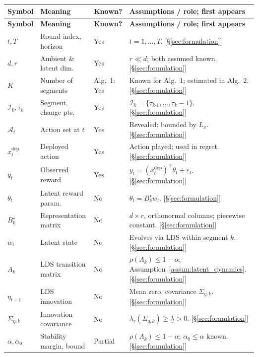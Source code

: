 \documentclass{article}
\newcommand{\cA}{\mathcal{A}}
\newcommand{\cI}{\mathcal{I}}
\begin{document}
\begin{longtable}{@{}p{} p{} p{} p{}@{}}
\toprule
\textbf{Symbol} & \textbf{Meaning} & \textbf{Known?} & \textbf{Assumptions / role; first appears} \\
\midrule
\endfirsthead
\toprule
\textbf{Symbol} & \textbf{Meaning} & \textbf{Known?} & \textbf{Assumptions / role; first appears} \\
\midrule
\endhead
\bottomrule
\endfoot
$t, T$ & Round index, horizon & Yes & $t=1,\dots,T$. [\S\ref{sec:formulation}] \\
$d, r$ & Ambient \& latent dim. & Yes & $r\ll d$; both assumed known. [\S\ref{sec:formulation}] \\
$K$ & Number of segments & Alg.~1: Yes & Known for Alg.~1; estimated in Alg.~2. [\S\ref{sec:formulation}] \\
$\cI_k, \tau_k$ & Segment, change pts. & Yes & $\cI_k = \{\tau_{k\text{-}1},\dots,\tau_k{-}1\}$. [\S\ref{sec:formulation}] \\
$\cA_t$ & Action set at $t$ & Yes & Revealed; bounded by $L_x$. [\S\ref{sec:formulation}] \\
$x_t^{\mathrm{dep}}$ & Deployed action & Yes & Action played; used in regret. [\S\ref{sec:formulation}] \\
$y_t$ & Observed reward & Yes & $y_t=(x_t^{\mathrm{dep}})^\top\theta_t+\varepsilon_t$. [\S\ref{sec:formulation}] \\
$\theta_t$ & Latent reward param. & No & $\theta_t = B_k^\star w_t$. [\S\ref{sec:formulation}] \\
$B_k^\star$ & Representation matrix & No & $d{\times}r$, orthonormal columns; piecewise constant. [\S\ref{sec:formulation}] \\
$w_t$ & Latent state & No & Evolves via LDS within segment $k$. [\S\ref{sec:formulation}] \\
$A_k$ & LDS transition matrix & No & $\rho(A_k)\le 1{-}\alpha$; Assumption~\ref{assum:latent_dynamics}. [\S\ref{sec:formulation}] \\
$\eta_{t-1}$ & LDS innovation & No & Mean zero, covariance $\Sigma_{\eta,k}$. [\S\ref{sec:formulation}] \\
$\Sigma_{\eta,k}$ & Innovation covariance & No & $\lambda_r(\Sigma_{\eta,k}) \ge \underline{\lambda} > 0$. [\S\ref{sec:formulation}] \\
$\alpha, \alpha_0$ & Stability margin, bound & Partial & $\rho(A_k) \le 1{-}\alpha$; $\alpha_0 \le \alpha$ known. [\S\ref{sec:formulation}] \\

\end{longtable}
\end{document}
